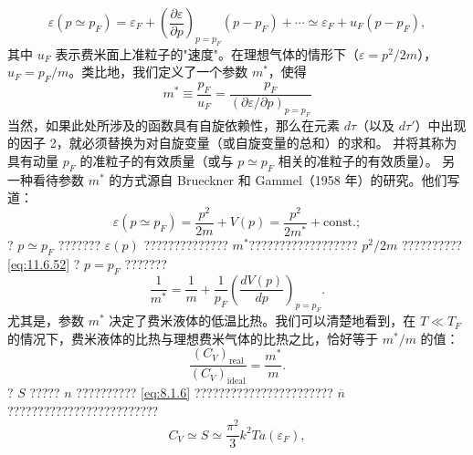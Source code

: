 \begin{equation}\tag{11.6.50}\label{eq:11.6.50}
\varepsilon ( p \simeq p _ { F } ) = \varepsilon _ { F } + \left( \frac { \partial \varepsilon } { \partial p } \right) _ { p = p _ { F } } ( p - p _ { F } ) + \cdots \simeq \varepsilon _ { F } + u _ { F } ( p - p _ { F } ) ,
\end{equation}
其中 \(u_{F}\) 表示费米面上准粒子的"速度"。在理想气体的情形下（\(\varepsilon = p^{2}/2m\)），\(u_{F} = p_{F}/m\)。类比地，我们定义了一个参数 \(m^{*}\)，使得
\begin{equation}\tag{11.6.51}\label{eq:11.6.51}
m ^{*} \equiv \frac { p _ { F } } { u _ { F } } = \frac { p _ { F } } { ( \partial \varepsilon / \partial p ) _ { p = p _ { F } } }
\end{equation}
当然，如果此处所涉及的函数具有自旋依赖性，那么在元素 \(d\tau\)（以及 \(d\tau'\)）中出现的因子 2，就必须替换为对自旋变量（或自旋变量的总和）的求和。
并将其称为具有动量 \(p_F\) 的准粒子的有效质量（或与 \(p \simeq p_F\) 相关的准粒子的有效质量）。
另一种看待参数 \(m^{*}\) 的方式源自 Brueckner 和 Gammel（1958 年）的研究。他们写道：
\begin{equation}\tag{11.6.52}\label{eq:11.6.52}
\varepsilon ( p \simeq p _ { F } ) = \frac { p ^{2} } { 2 m } + V ( p ) = \frac { p ^{2} } { 2 m ^{*} } + \mathrm { c o n s t . } ;
\end{equation}
? \(p\simeq p_{F}\) ??????? \(\varepsilon(p)\) ?????????????? \(m^{*}\)?????????????????? \(p^{2}/2m\) ?????????? \autoref{eq:11.6.52} ? \(p=p_F\) ???????
\begin{equation}\tag{11.6.53}\label{eq:11.6.53}
\frac { 1 } { m ^{*} } = \frac { 1 } { m } + \frac { 1 } { p _ { F } } \left( \frac { d V ( p ) } { d p } \right) _ { p = p _ { F } } .
\end{equation}
尤其是，参数 \(m^{*}\) 决定了费米液体的低温比热。我们可以清楚地看到，在 \(T \ll T_{F}\) 的情况下，费米液体的比热与理想费米气体的比热之比，恰好等于 \(m^{*}/m\) 的值：
\begin{equation}\tag{11.6.54}\label{eq:11.6.54}
\frac { ( C _ { V } ) _ { \mathrm { r e a l } } } { ( C _ { V } ) _ { \mathrm { i d e a l } } } = \frac { m ^{*} } { m } .
\end{equation}
? \(S\) ????? \(n\) ?????????? \autoref{eq:8.1.6} ??????????????????????? \(\overline{n}\)?????????????????????????
\begin{equation}\tag{11.6.55}\label{eq:11.6.55}
C _ { V } \simeq S \simeq \frac { \pi ^{2} } { 3 } k ^{2} T a ( \varepsilon _ { F } ) ,
\end{equation}
